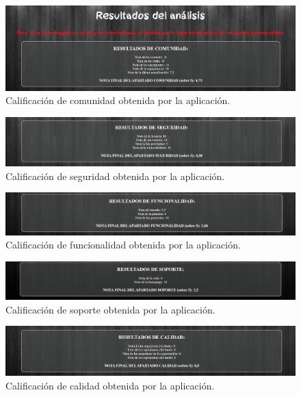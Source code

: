 \documentclass[a4paper, 12pt]{book}
\begin{document}
\begin{figure}
    \centering
    \includegraphics[width=1\textwidth, keepaspectratio]{img/test_comunidad.png}
    \caption{Calificación de comunidad obtenida por la aplicación.}\label{fig:test_comunidad}
\end{figure}
\begin{figure}
    \centering
    \includegraphics[width=1\textwidth, keepaspectratio]{img/test_seguridad.png}
    \caption{Calificación de seguridad obtenida por la aplicación.}\label{fig:test_seguridad}
\end{figure}
\begin{figure}
    \centering
    \includegraphics[width=1\textwidth, keepaspectratio]{img/test_funcionalidad.png}
    \caption{Calificación de funcionalidad obtenida por la aplicación.}\label{fig:test_funcionalidad}
\end{figure}
\begin{figure}
    \centering
    \includegraphics[width=1\textwidth, keepaspectratio]{img/test_soporte.png}
    \caption{Calificación de soporte obtenida por la aplicación.}\label{fig:test_soporte}
\end{figure}
\begin{figure}
    \centering
    \includegraphics[width=1\textwidth, keepaspectratio]{img/test_calidad.png}
    \caption{Calificación de calidad obtenida por la aplicación.}\label{fig:test_calidad}
\end{figure}
\end{document}
